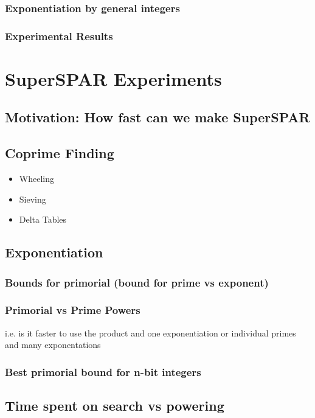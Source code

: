 \documentclass{ucalgthes1}
\theoremstyle{definition}
\begin{document}
\subsection{Exponentiation by general integers}

\subsection{Experimental Results}

\chapter{SuperSPAR Experiments}

\section{Motivation: How fast can we make SuperSPAR}

\bigbreak
\section{Coprime Finding}
\begin{itemize}
\item Wheeling
\item Sieving
\item Delta Tables
\end{itemize}

\bigbreak
\section{Exponentiation}
\subsection{Bounds for primorial (bound for prime vs exponent)}
\subsection{Primorial vs Prime Powers}
i.e. is it faster to use the product and one exponentiation or individual primes and many exponentations
\subsection{Best primorial bound for n-bit integers}

\section{Time spent on search vs powering}
\end{document}
